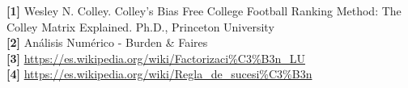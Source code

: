 \textbf{[1]} Wesley N. Colley. Colley’s Bias Free College Football Ranking Method: The Colley Matrix Explained. Ph.D., Princeton University \\

\textbf{[2]} An\'alisis Num\'erico - Burden \& Faires \\

\textbf{[3]} \url{https://es.wikipedia.org/wiki/Factorizaci\%C3\%B3n_LU} \\

\textbf{[4]} \url{https://es.wikipedia.org/wiki/Regla_de_sucesi\%C3\%B3n}